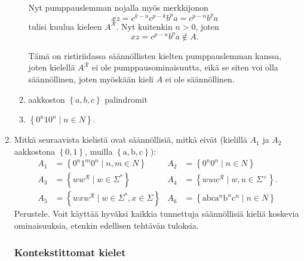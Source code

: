 \documentclass[a4paper,11pt]{article}
\newcommand{\set}[1]{{\left\{ #1 \right\}}}
\begin{document}
\begin{enumerate}
\begin{enumerate}
  Nyt pumppauslemman nojalla myös merkkijonon
  \begin{equation*}
    xz = c^{k-n}c^{p-k}b^pa = c^{p-n}b^pa
  \end{equation*}
  tulisi kuulua kieleen $A^\mathcal{R}$. Nyt kuitenkin $n > 0$, joten
  \begin{equation*}
    xz = c^{p-n}b^pa \notin A.
  \end{equation*}

  Tämä on ristiriidassa säännöllisten kielten pumppauslemman kanssa, joten
  kielellä $A^\mathcal{R}$ ei ole pumppausominaisuutta, eikä se siten voi olla
  säännöllinen, joten myöskään kieli $A$ ei ole säännöllinen.

\item
aakkoston $\set{a,b, c}$ palindromit
\item
$\set{0^n10^n\mid n\in N}$.
\end{enumerate}

\item
  Mitkä seuraavista kielistä ovat säännöllisiä, mitkä
  eivät (kielillä $A_1$ ja $A_2$ aakkostona $\set{0,1}$, muilla
  $\set{\mathrm{a},\mathrm{b},\mathrm{c}}$):
  \begin{align*}
    A_1 &=\set{0^n1^m0^n\mid n,m\in N}
    &A_2 &=\set{0^n0^n\mid n\in N}
    \\
    A_3 &=\set{ww^\mathcal{R}\mid w\in\Sigma^{\ast}}
    &A_4 &=\set{wuw^\mathcal{R}\mid w,u\in\Sigma^+}.
    \\
    A_5 &=\set{wxw^\mathcal{R}\mid w\in\Sigma^{\ast},x\in\Sigma}
    &A_6 &=\set{\mathrm{abc}\mathrm{a}^n\mathrm{b}^n\mathrm{c}^n\mid n\in N}
  \end{align*}
  Perustele. Voit käyttää hyväksi kaikkia tunnettuja säännöllisiä kieliä
  koskevia ominaisuuksia, etenkin edellisen tehtävän tuloksia.

  \subsubsection*{Kontekstittomat kielet}


\end{enumerate}
\end{document}

